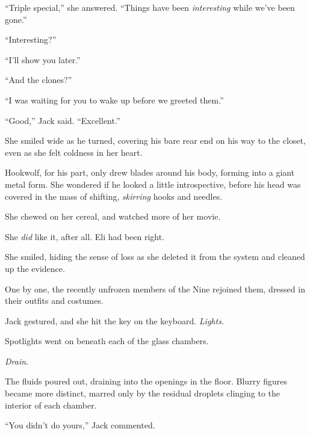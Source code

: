 ``Triple special,'' she answered.  ``Things have been \emph{interesting} while we've been gone.''



``Interesting?''



``I'll show you later.''



``And the clones?''



``I was waiting for you to wake up before we greeted them.''



``Good,'' Jack said.  ``Excellent.''



She smiled wide as he turned, covering his bare rear end on his way to the closet, even as she felt coldness in her heart.



Hookwolf, for his part, only drew blades around his body, forming into a giant metal form.  She wondered if he looked a little introspective, before his head was covered in the mass of shifting, \emph{skirring} hooks and needles.



She chewed on her cereal, and watched more of her movie.



She \emph{did} like it, after all.  Eli had been right.



She smiled, hiding the sense of loss as she deleted it from the system and cleaned up the evidence.



One by one, the recently unfrozen members of the Nine rejoined them, dressed in their outfits and costumes.



Jack gestured, and she hit the key on the keyboard.  \emph{Lights.}



Spotlights went on beneath each of the glass chambers.



\emph{Drain}.



The fluids poured out, draining into the openings in the floor.  Blurry figures became more distinct, marred only by the residual droplets clinging to the interior of each chamber.



``You didn't do yours,'' Jack commented.



